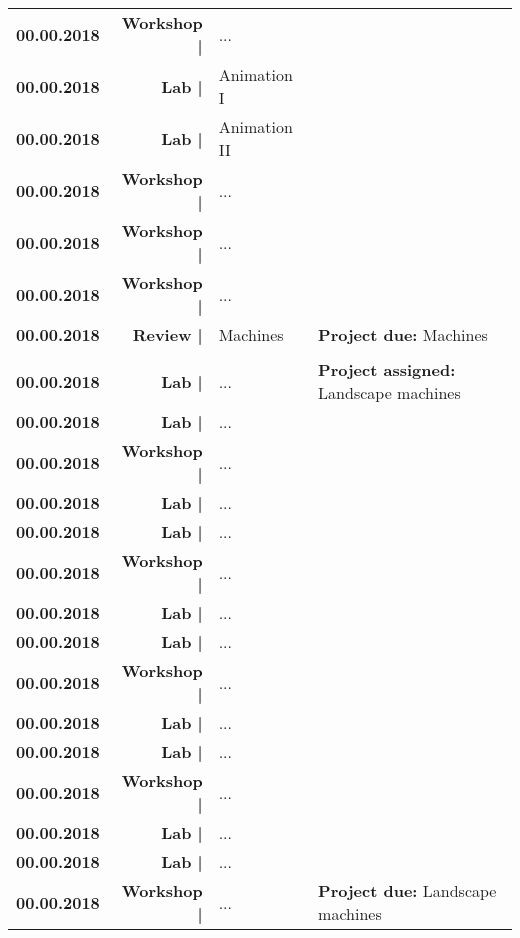 \documentclass[11pt,article,oneside]{memoir}
\begin{document}
\begin{table}[H]
\begin{tabular}{l r @{\hskip 0.1cm} l @{\hskip 0.5cm} l}
\textbf{00.00.2018} & \textbf{Workshop |} & ...\\ 
\textbf{00.00.2018} & \textbf{Lab |} & Animation I\\
\textbf{00.00.2018} & \textbf{Lab |} & Animation II\\
\textbf{00.00.2018} & \textbf{Workshop |} & ...\\
\textbf{00.00.2018} & \textbf{Workshop |} & ...\\
\textbf{00.00.2018} & \textbf{Workshop |} & ...\\
\textbf{00.00.2018} & \textbf{Review |} & Machines & \textbf{Project due:} Machines\\
\\
\textbf{00.00.2018} & \textbf{Lab |} & ... & \textbf{Project assigned:} Landscape machines\\
\textbf{00.00.2018} & \textbf{Lab |} & ...\\
\textbf{00.00.2018} & \textbf{Workshop |} & ...\\
\textbf{00.00.2018} & \textbf{Lab |} & ...\\
\textbf{00.00.2018} & \textbf{Lab |} & ...\\
\textbf{00.00.2018} & \textbf{Workshop |} & ...\\
\textbf{00.00.2018} & \textbf{Lab |} & ...\\
\textbf{00.00.2018} & \textbf{Lab |} & ...\\
\textbf{00.00.2018} & \textbf{Workshop |} & ...\\
\textbf{00.00.2018} & \textbf{Lab |} & ...\\
\textbf{00.00.2018} & \textbf{Lab |} & ...\\
\textbf{00.00.2018} & \textbf{Workshop |} & ...\\
\textbf{00.00.2018} & \textbf{Lab |} & ...\\
\textbf{00.00.2018} & \textbf{Lab |} & ...\\
\textbf{00.00.2018} & \textbf{Workshop |} & ... & \textbf{Project due:} Landscape machines\\
%
\end{tabular}
\end{table}

\clearpage

%
\end{document}
